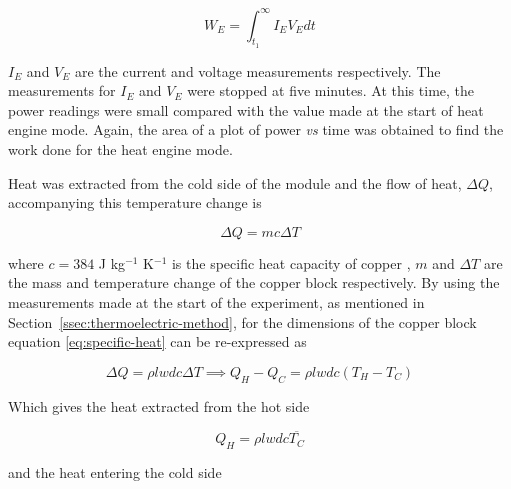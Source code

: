 \documentclass{article}
\newcommand{\secref}[2][Section~]{#1\ref{#2}}
\begin{document}
\begin{equation}
\label{eq:engine-work}
W_E = \int_{t_1}^{\infty} I_E V_E dt
\end{equation}

\vspace{2mm}  
\noindent
$I_E$ and $V_E$ are the current and voltage measurements respectively. The measurements for $I_E$ and $V_E$ were stopped at five minutes. At this time, the power readings were small compared with the value made at the start of heat engine mode. Again, the area of a plot of power \textit{vs} time was obtained to find the work done for the heat engine mode. 


\vspace{2mm}  
\noindent
Heat was extracted from the cold side of the module and the flow of heat, $\Delta Q$, accompanying this temperature change is

\begin{equation}
\label{eq:specific-heat}
\Delta Q = mc\Delta T
\end{equation}

\vspace{2mm}  
\noindent
where $c = 384$ J kg$^{-1}$ K$^{-1}$ is the specific heat capacity of copper \cite{Paper02}, $m$ and $\Delta T$ are the mass and temperature change of the copper block respectively. By using the measurements made at the start of the experiment, as mentioned in \secref{ssec:thermoelectric-method}, for the dimensions of the copper block equation \eqref{eq:specific-heat} can be re-expressed as 

\begin{equation}
\label{eq:specific-heat1}
\Delta Q = \rho lwdc\Delta T \implies Q_H - Q_C = \rho lwdc(T_H - T_C)
\end{equation}

\vspace{2mm}  
\noindent
Which gives the heat extracted from the hot side

\begin{equation}
\label{eq:heat-extract}
Q_H = \rho lwdc \overline{T_C}
\end{equation}

\vspace{2mm}  
\noindent
and the heat entering the cold side
\end{document}
